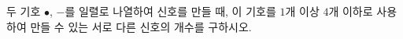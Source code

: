 두 기호 $\bullet$, $-$를 일렬로 나열하여 신호를 만들 때, 이 기호를 \mbox{$1$개} 이상 $4$개 이하로 사용하여 만들 수 있는 서로 다른 신호의 개수를 구하시오.
